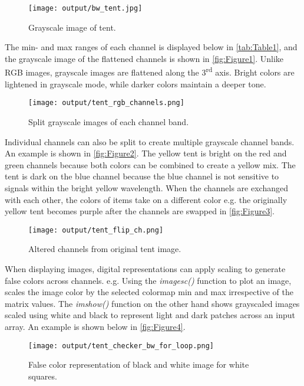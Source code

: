 \documentclass[12pt]{report}
\begin{document}
\begin{enumerate}
    \begin{figure}[ht!]
        \texttt{[image: output/bw\_tent.jpg]}
        \centering
        \caption{Grayscale image of tent.}
        \label{fig:Figure1}
    \end{figure}

    \newpage
    The min- and max ranges of each channel is displayed below in \autoref{tab:Table1}, and 
    the grayscale image of the flattened channels is shown in \autoref{fig:Figure1}. Unlike RGB
    images, grayscale images are flattened along the 3\textsuperscript{rd} axis. Bright colors
    are lightened in grayscale mode, while darker colors maintain a deeper tone. 

    \begin{figure}[ht!]
        \texttt{[image: output/tent\_rgb\_channels.png]}
        \centering
        \caption{Split grayscale images of each channel band.}
        \label{fig:Figure2}
    \end{figure}

    Individual channels can also be split to create multiple grayscale channel bands. An
    example is shown in \autoref{fig:Figure2}. The yellow tent is bright on the red and 
    green channels because both colors can be combined to create a yellow mix. The tent 
    is dark on the blue channel because the blue channel is not sensitive to signals 
    within the bright yellow wavelength. When the channels are exchanged with each other, 
    the colors of items take on a different color e.g. the originally yellow tent becomes 
    purple after the channels are swapped in \autoref{fig:Figure3}.

    \begin{figure}[ht!]
        \texttt{[image: output/tent\_flip\_ch.png]}
        \centering
        \caption{Altered channels from original tent image.}
        \label{fig:Figure3}
    \end{figure}

    When displaying images, digital representations can apply scaling to generate false colors
    across channels. e.g. Using the \emph{imagesc()} function to plot an image, scales the image 
    color by the selected colormap min and max irrespective of the matrix values. The \emph{imshow()}
    function on the other hand shows grayscaled images scaled using white and black to represent 
    light and dark patches across an input array. An example is shown below in \autoref{fig:Figure4}.

    \newpage
    \begin{figure}[ht!]
        \texttt{[image: output/tent\_checker\_bw\_for\_loop.png]}
        \centering
        \caption{False color representation of black and white image for white squares.}
        \label{fig:Figure4}
    \end{figure}


\end{enumerate}
\end{document}
